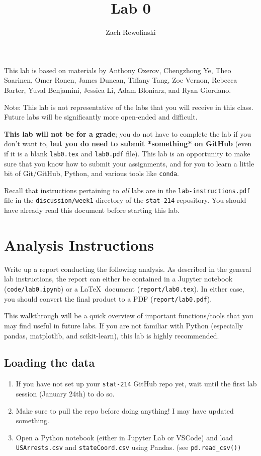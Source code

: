\documentclass[letterpaper,12pt]{article}
\title{Lab 0}
\author{Zach Rewolinski}
\begin{document}
\maketitle

This lab is based on materials by Anthony Ozerov, Chengzhong Ye, Theo Saarinen, Omer Ronen, James Duncan, Tiffany Tang, Zoe Vernon, Rebecca Barter, Yuval Benjamini, Jessica Li, Adam Bloniarz, and Ryan Giordano.

Note: This lab is not representative of the labs that you will receive in this class. Future labs will be significantly more open-ended and difficult.

\textbf{This lab will not be for a grade}; you do not have to complete the lab if you don't want to, \textbf{but you do need to submit *something* on GitHub} (even if it is a blank \texttt{lab0.tex} and \texttt{lab0.pdf} file). This lab is an opportunity to make sure that you know how to submit your assignments, and for you to learn a little bit of Git/GitHub, Python, and various tools like \texttt{conda}.

Recall that instructions pertaining to \textit{all} labs are in the \texttt{lab-instructions.pdf} file in the \texttt{discussion/week1} directory of the \texttt{stat-214} repository. You should have already read this document before starting this lab.

\section{Analysis Instructions}

Write up a report conducting the following analysis. As described in the general lab instructions, the report can either be contained in a Jupyter notebook (\texttt{code/lab0.ipynb}) or a \LaTeX\ document (\texttt{report/lab0.tex}). In either case, you should convert the final product to a PDF (\texttt{report/lab0.pdf}).

This walkthrough will be a quick overview of important functions/tools that you may find useful in future labs. If you are not familiar with Python (especially pandas, matplotlib, and scikit-learn), this lab is highly recommended.

\subsection{Loading the data}
\begin{enumerate}
\item If you have not set up your \texttt{stat-214} GitHub repo yet, wait until the first lab session (January 24th) to do so.
\item Make sure to pull the repo before doing anything! I may have updated something.
\item Open a Python notebook (either in Jupyter Lab or VSCode) and load \texttt{USArrests.csv} and \texttt{stateCoord.csv} using Pandas. (see \texttt{pd.read\_csv())}
\end{enumerate}
\end{document}
